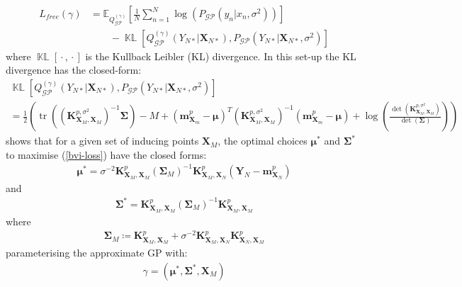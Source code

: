 \documentclass{article}
\newcommand{\KLD}{\operatorname{\mathbb{KL}}}
\newcommand{\tr}{\operatorname{tr}}
\newcommand{\GP}{\operatorname{\mathcal{GP}}}
\newcommand{\wc}{\operatorname{{}\cdot{}}}
\numberwithin{equation}{section}
\begin{document}
\begin{align}
    \label{bvi-loss}
    L_{free}(\gamma) &=\mathbb{E}_{Q^{(\gamma)}_{\GP}}\left[\frac{1}{N}\sum_{n=1}^N\log \left(P_{\GP}\left(y_n \vert x_n, \sigma^2\right)\right)\right] \nonumber \\
    & \qquad - \KLD \left[Q^{(\gamma)}_{\GP}\left(Y_{N*} \vert \mathbf{X}_{N*}\right), P_{\GP}\left( Y_{N*} \vert \mathbf{X}_{N*}, \sigma^2\right) \right]
\end{align}
where $\KLD[\wc, \wc]$ is the Kullback Leibler (KL) divergence. In this set-up the KL divergence has the closed-form:
  \begin{multline}
    \KLD \left[Q^{(\gamma)}_{\GP}\left(Y_{N*} \vert \mathbf{X}_{N*}\right), P_{\GP}\left( Y_{N*} \vert \mathbf{X}_{N*}, \sigma^2\right) \right] \\
    = \frac{1}{2}\left( \tr\left(\left(\mathbf{K}^{p, \sigma^2}_{\mathbf{X}_M, \mathbf{X}_M}\right)^{-1} \boldsymbol{\Sigma}\right) - M +
    \left(\mathbf{m}^p_{\mathbf{X}_m} - \boldsymbol{\mu}\right)^T \left(\mathbf{K}^{p, \sigma^2}_{\mathbf{X}_M, \mathbf{X}_M}\right)^{-1} \left(\mathbf{m}^p_{\mathbf{X}_m} - \boldsymbol{\mu}\right)+ \log\left(\frac{\det\left(\mathbf{K}^{p, \sigma^2}_{\mathbf{X}_M, \mathbf{X}_M}\right)}{\det\left(\boldsymbol{\Sigma}\right)}\right) \right)
  \end{multline}
\cite{titsias2009variational} shows that for a given set of inducing points $\mathbf{X}_M$, the optimal choices $\boldsymbol{\mu}^*$ and $\mathbf{\Sigma}^*$ to maximise (\ref{bvi-loss}) have the closed forms:
\begin{align}
    \boldsymbol{\mu}^* = \sigma^{-2}\mathbf{K}^p_{\mathbf{X}_M, \mathbf{X}_M}  \left(\mathbf{\Sigma}_M\right)^{-1}\mathbf{K}^p_{\mathbf{X}_M, \mathbf{X}_N}  \left(\mathbf{Y}_N - \mathbf{m}^p_{\mathbf{X}_N}\right)
\end{align}
and
\begin{align}
    \mathbf{\Sigma}^* = \mathbf{K}^p_{\mathbf{X}_M, \mathbf{X}_M}  \left(\mathbf{\Sigma}_M\right)^{-1}\mathbf{K}^p_{\mathbf{X}_M, \mathbf{X}_M}
\end{align}
where
\begin{align}
    \mathbf{\Sigma}_M \coloneqq \mathbf{K}^p_{\mathbf{X}_M, \mathbf{X}_M}  + \sigma^{-2}\mathbf{K}^p_{\mathbf{X}_M, \mathbf{X}_N} \mathbf{K}^p_{\mathbf{X}_N, \mathbf{X}_M}
\end{align}
parameterising the approximate GP with:
\begin{align}
    \gamma = \left(\boldsymbol{\mu}^*, \mathbf{\Sigma}^*,  \mathbf{X}_M\right)
\end{align}
\end{document}

